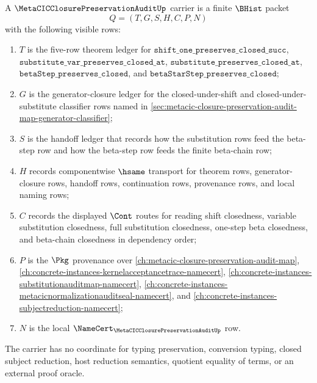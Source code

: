 \begin{definition}
\label{def:metacic-closure-preservation-audit-carrier}
A $\MetaCICClosurePreservationAuditUp$ carrier is a finite $\BHist$ packet
$$
Q=(T,G,S,H,C,P,N)
$$
with the following visible rows:
\begin{enumerate}
\item $T$ is the five-row theorem ledger for $\texttt{shift\_one\_preserves\_closed\_succ}$, $\texttt{substitute\_var\_preserves\_closed\_at}$, $\texttt{substitute\_preserves\_closed\_at}$, $\texttt{betaStep\_preserves\_closed}$, and $\texttt{betaStarStep\_preserves\_closed}$;
\item $G$ is the generator-closure ledger for the closed-under-shift and closed-under-substitute classifier rows named in \autoref{sec:metacic-closure-preservation-audit-map-generator-classifier};
\item $S$ is the handoff ledger that records how the substitution rows feed the beta-step row and how the beta-step row feeds the finite beta-chain row;
\item $H$ records componentwise $\hsame$ transport for theorem rows, generator-closure rows, handoff rows, continuation rows, provenance rows, and local naming rows;
\item $C$ records the displayed $\Cont$ routes for reading shift closedness, variable substitution closedness, full substitution closedness, one-step beta closedness, and beta-chain closedness in dependency order;
\item $P$ is the $\Pkg$ provenance over \autoref{ch:metacic-closure-preservation-audit-map}, \autoref{ch:concrete-instances-kernelacceptancetrace-namecert}, \autoref{ch:concrete-instances-substitutionauditmap-namecert}, \autoref{ch:concrete-instances-metacicnormalizationauditseal-namecert}, and \autoref{ch:concrete-instances-subjectreduction-namecert};
\item $N$ is the local $\NameCert_{\MetaCICClosurePreservationAuditUp}$ row.
\end{enumerate}
The carrier has no coordinate for typing preservation, conversion typing, closed subject reduction, host reduction semantics, quotient equality of terms, or an external proof oracle.
\end{definition}

